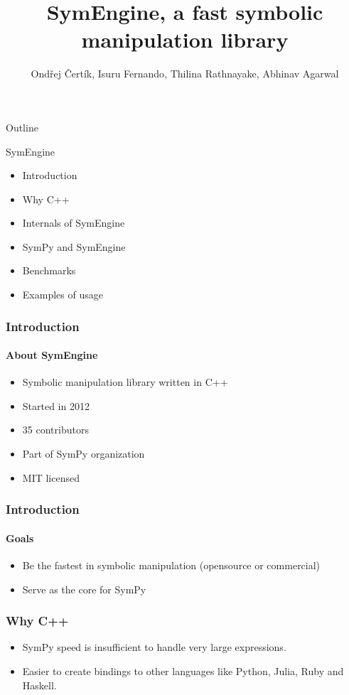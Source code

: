 \documentclass{beamer}
\title[SymEngine \hspace{14em}\insertframenumber/
\inserttotalframenumber]{SymEngine, a fast symbolic manipulation library}
\author[O. Čertík, I. Fernando, ...]{Ondřej Čertík, Isuru Fernando, Thilina Rathnayake, Abhinav Agarwal}
\begin{document}
\begin{frame}
\maketitle
\end{frame}


\begin{frame}{Outline}
\begin{block}{SymEngine}
\begin{itemize}
\item Introduction
\item Why C++
\item Internals of SymEngine
\item SymPy and SymEngine
\item Benchmarks
\item Examples of usage
\end{itemize}
\end{block}
\end{frame}


\begin{frame}
\frametitle{Introduction}
\framesubtitle{About SymEngine}
\begin{itemize}
\item Symbolic manipulation library written in C++
\item Started in 2012
\item 35 contributors
\item Part of SymPy organization
\item MIT licensed
\end{itemize}
\end{frame}


\begin{frame}
\frametitle{Introduction}
\framesubtitle{Goals}
\begin{itemize}
\item Be the fastest in symbolic manipulation (opensource or commercial)
\item Serve as the core for SymPy
\end{itemize}
\end{frame}


\begin{frame}
\frametitle{Why C++}
\begin{itemize}
\item SymPy speed is insufficient to handle very large expressions.
\item Easier to create bindings to other languages like Python, Julia, Ruby and Haskell.
\end{itemize}
\end{frame}
\end{document}
